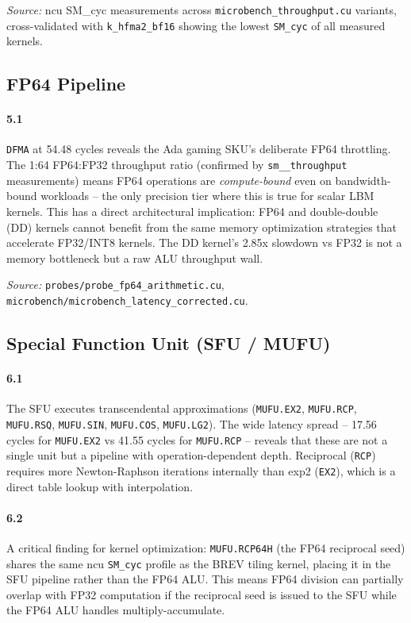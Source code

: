 \textit{Source:} ncu SM\_cyc measurements across \texttt{microbench\_throughput.cu}
variants, cross-validated with \texttt{k\_hfma2\_bf16} showing the lowest
\texttt{SM\_cyc} of all measured kernels.

\subsection{FP64 Pipeline}
\label{par:fp64}

\paragraph{5.1}
\texttt{DFMA} at 54.48 cycles reveals the Ada gaming SKU's deliberate FP64
throttling.  The 1:64 FP64:FP32 throughput ratio (confirmed by
\texttt{sm\_\_throughput} measurements) means FP64 operations are
\emph{compute-bound} even on bandwidth-bound workloads -- the only precision
tier where this is true for scalar LBM kernels.  This has a direct
architectural implication: FP64 and double-double (DD) kernels cannot benefit
from the same memory optimization strategies that accelerate FP32/INT8 kernels.
The DD kernel's 2.85x slowdown vs FP32 is not a memory bottleneck but a raw
ALU throughput wall.

\textit{Source:} \texttt{probes/probe\_fp64\_arithmetic.cu},
\texttt{microbench/microbench\_latency\_corrected.cu}.

\subsection{Special Function Unit (SFU / MUFU)}
\label{par:sfu}

\paragraph{6.1}
The SFU executes transcendental approximations (\texttt{MUFU.EX2},
\texttt{MUFU.RCP}, \texttt{MUFU.RSQ}, \texttt{MUFU.SIN}, \texttt{MUFU.COS},
\texttt{MUFU.LG2}).  The wide latency spread -- 17.56 cycles for
\texttt{MUFU.EX2} vs 41.55 cycles for \texttt{MUFU.RCP} -- reveals that
these are not a single unit but a pipeline with operation-dependent depth.
Reciprocal (\texttt{RCP}) requires more Newton-Raphson iterations internally
than exp2 (\texttt{EX2}), which is a direct table lookup with interpolation.

\paragraph{6.2}
A critical finding for kernel optimization: \texttt{MUFU.RCP64H} (the FP64
reciprocal seed) shares the same ncu \texttt{SM\_cyc} profile as the BREV
tiling kernel, placing it in the SFU pipeline rather than the FP64 ALU.
This means FP64 division can partially overlap with FP32 computation if
the reciprocal seed is issued to the SFU while the FP64 ALU handles
multiply-accumulate.

